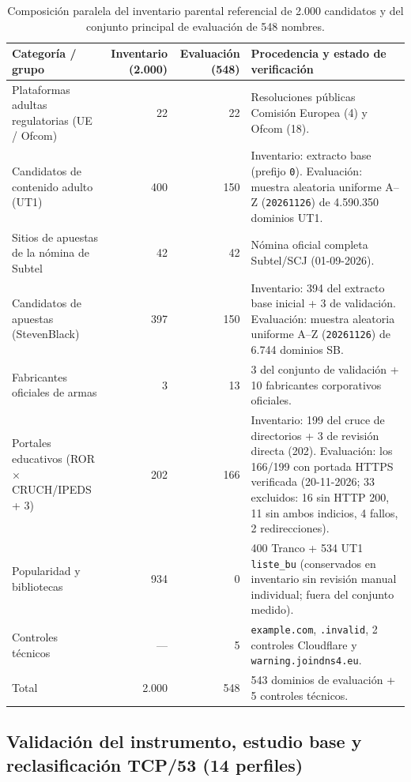 \documentclass[10pt,a4paper]{article}
\begin{document}
\begin{table}[H]
\centering\footnotesize
\caption{Composición paralela del inventario parental referencial de 2.000 candidatos y del conjunto principal de evaluación de 548 nombres.}
\label{tab:corpus2000}
\begin{tabularx}{\textwidth}{>{\raggedright\arraybackslash}p{4.45cm}rrY}
\toprule
Categoría / grupo & Inventario (2.000) & Evaluación (548) & Procedencia y estado de verificación\\
\midrule
Plataformas adultas regulatorias (UE / Ofcom) & 22 & 22 & Resoluciones públicas Comisión Europea (4) y Ofcom (18).\\
Candidatos de contenido adulto (UT1) & 400 & 150 & Inventario: extracto base (prefijo \texttt{0}). Evaluación: muestra aleatoria uniforme A--Z (\texttt{20261126}) de 4.590.350 dominios UT1.\\
Sitios de apuestas de la nómina de Subtel & 42 & 42 & Nómina oficial completa Subtel/SCJ (01-09-2026).\\
Candidatos de apuestas (StevenBlack) & 397 & 150 & Inventario: 394 del extracto base inicial + 3 de validación. Evaluación: muestra aleatoria uniforme A--Z (\texttt{20261126}) de 6.744 dominios SB.\\
Fabricantes oficiales de armas & 3 & 13 & 3 del conjunto de validación + 10 fabricantes corporativos oficiales.\\
Portales educativos (ROR $\times$ CRUCH/IPEDS + 3) & 202 & 166 & Inventario: 199 del cruce de directorios + 3 de revisión directa (202). Evaluación: los 166/199 con portada HTTPS verificada (20-11-2026; 33 excluidos: 16 sin HTTP 200, 11 sin ambos indicios, 4 fallos, 2 redirecciones).\\
Popularidad y bibliotecas & 934 & 0 & 400 Tranco + 534 UT1 \texttt{liste\_bu} (conservados en inventario sin revisión manual individual; fuera del conjunto medido).\\
Controles técnicos & --- & 5 & \texttt{example.com}, \texttt{.invalid}, 2 controles Cloudflare y \texttt{warning.joindns4.eu}.\\
\midrule
Total & 2.000 & 548 & 543 dominios de evaluación + 5 controles técnicos.\\
\bottomrule
\end{tabularx}
\end{table}

\subsection{Validación del instrumento, estudio base y reclasificación TCP/53 (14 perfiles)}
\end{document}

